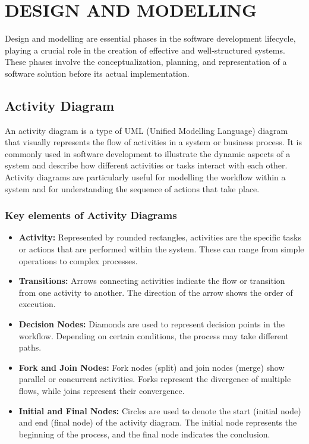 \chapter{DESIGN AND MODELLING}

Design and modelling are essential phases in the software development lifecycle, playing a
crucial role in the creation of effective and well-structured systems. These phases involve
the conceptualization, planning, and representation of a software solution before its actual
implementation.
\section{Activity Diagram}
An activity diagram is a type of UML (Unified Modelling Language) diagram that visually represents the flow of activities in a system or business process. It is commonly used in software development to illustrate the dynamic aspects of a system and describe how different activities or tasks interact with each other. Activity diagrams are particularly useful for modelling the workflow within a system and for understanding the sequence of actions that take place.

\subsection{Key elements of Activity Diagrams}
\begin{itemize}
    \item \textbf{Activity:} Represented by rounded rectangles, activities are the specific tasks or actions that are performed within the system. These can range from simple operations to complex processes.
    \item \textbf{Transitions:} Arrows connecting activities indicate the flow or transition from one activity to another. The direction of the arrow shows the order of execution.
    \item \textbf{Decision Nodes:} Diamonds are used to represent decision points in the workflow. Depending on certain conditions, the process may take different paths.
    \item \textbf{Fork and Join Nodes:} Fork nodes (split) and join nodes (merge) show parallel or concurrent activities. Forks represent the divergence of multiple flows, while joins represent their convergence.
    \item \textbf{Initial and Final Nodes:} Circles are used to denote the start (initial node) and end (final node) of the activity diagram. The initial node represents the beginning of the process, and the final node indicates the conclusion.
\end{itemize}


